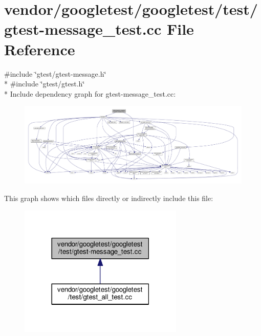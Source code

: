 \hypertarget{gtest-message__test_8cc}{}\section{vendor/googletest/googletest/test/gtest-\/message\+\_\+test.cc File Reference}
\label{gtest-message__test_8cc}
{\ttfamily \#include \char`\"{}gtest/gtest-\/message.\+h\char`\"{}}\\*
{\ttfamily \#include \char`\"{}gtest/gtest.\+h\char`\"{}}\\*
Include dependency graph for gtest-\/message\+\_\+test.cc\+:\nopagebreak
\begin{figure}[H]
\begin{center}
\leavevmode
\includegraphics[width=350pt]{gtest-message__test_8cc__incl}
\end{center}
\end{figure}
This graph shows which files directly or indirectly include this file\+:\nopagebreak
\begin{figure}[H]
\begin{center}
\leavevmode
\includegraphics[width=222pt]{gtest-message__test_8cc__dep__incl}
\end{center}
\end{figure}
